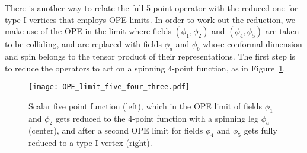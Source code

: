 \documentclass{article}
\begin{document}
There is another way to relate the full 5-point operator with the reduced one for 
type I vertices that employs OPE limits. In order to work out the reduction, we 
make use of the OPE in the limit where fields $(\phi_1,\phi_2)$ and $(\phi_4,\phi_5)$ 
are taken to be colliding, and are replaced with fields $\phi_a$ and 
$\phi_b$ whose conformal dimension and spin belongs to the tensor product 
of their representations. The first step is to reduce the operators to act on a 
spinning 4-point function, as in Figure~\ref{fig:OPElimit}.
\begin{figure}[htp]
    \centering
    \texttt{[image: OPE\_limit\_five\_four\_three.pdf]}
    \caption{Scalar five point function (left), which in the OPE limit of fields $\phi_1$ and $\phi_2$ gets reduced to the 4-point function with a spinning leg $\phi_a$ (center), and after a second OPE limit for fields $\phi_4$ and $\phi_5$ gets fully reduced to a type I vertex (right).}
    \label{fig:OPElimit}
\end{figure}
\end{document}
